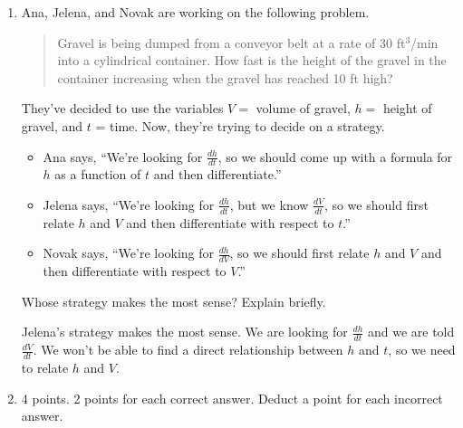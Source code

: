 \documentclass{article}
\begin{document}
\begin{enumerate}
\begin{enumerate}
  \end{enumerate}


\pspace{\newpage}

\item 
  \begin{problem}
    Ana, Jelena, and Novak are working on the following problem.
    \begin{quote} %
      Gravel is being dumped from a conveyor belt at a rate of 30
      ft$^3$/min into a cylindrical container.  How
      fast is the height of the gravel in the container increasing when the gravel has reached 10 ft high? 
    \end{quote}
    They've decided to use the variables $V = $ volume of gravel, $h = $
    height of gravel, and $t$ = time.  Now, they're trying to decide on a
    strategy.
    \begin{itemize}[nolistsep]
    \item Ana says, ``We're looking for $\frac{dh}{dt}$, so we should come up with a formula for
      $h$ as a function of $t$ and then differentiate.''
    \item Jelena says, ``We're looking for $\frac{dh}{dt}$, but we know
      $\frac{dV}{dt}$, so we should first relate $h$ and $V$ and then
      differentiate with respect to $t$.''
    \item Novak says, ``We're looking for $\frac{dh}{dV}$, so we should
      first relate $h$ and $V$ and then differentiate with
      respect to $V$.''
    \end{itemize}
    Whose strategy makes the most sense? Explain briefly.
  \end{problem}
  \pspace{\vfill}

  \begin{solution}
    Jelena's strategy makes the most sense. We are looking for $\frac{dh}{dt}$ and we are told $\frac{dV}{dt}$. We won't be able to find a direct relationship between $h$ and $t$, so we need to relate $h$ and $V$.
  \end{solution}

\item
\begin{grading}
4 points. 2 points for each correct answer. Deduct a point for each incorrect answer.
\end{grading}


\end{enumerate}
\end{document}
